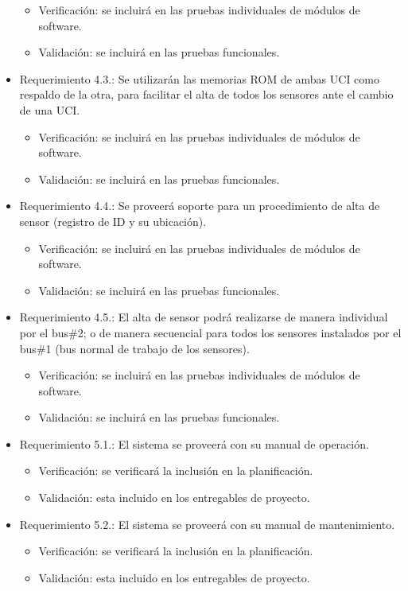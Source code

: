\documentclass[
11pt, %
codirector, %
]{charter}
\begin{document}
\begin{itemize}
\begin{itemize}
	\item Verificación: se incluirá en las pruebas individuales de módulos de software. 
	\item Validación: se incluirá en las pruebas funcionales. 
\end{itemize}
\item Requerimiento 4.3.: Se utilizarán las memorias ROM de ambas UCI como respaldo de la otra, para facilitar el alta de todos los sensores ante el cambio de una UCI. 
\begin{itemize}
	\item Verificación: se incluirá en las pruebas individuales de módulos de software. 
	\item Validación: se incluirá en las pruebas funcionales. 
\end{itemize}
\item Requerimiento 4.4.: Se proveerá soporte para un procedimiento de alta de sensor (registro de ID y su ubicación).  
\begin{itemize}
	\item Verificación: se incluirá en las pruebas individuales de módulos de software. 
	\item Validación: se incluirá en las pruebas funcionales. 
\end{itemize}
\item Requerimiento 4.5.: El alta de sensor podrá realizarse de manera individual por el bus\#2; o de manera secuencial para todos los sensores instalados por el bus\#1 (bus normal de trabajo de los sensores). 
\begin{itemize}
	\item Verificación: se incluirá en las pruebas individuales de módulos de software. 
	\item Validación: se incluirá en las pruebas funcionales. 
\end{itemize}
\item Requerimiento 5.1.: El sistema se proveerá con su manual de operación. 
\begin{itemize}
	\item Verificación: se verificará la inclusión en la planificación.
	\item Validación: esta incluido en los entregables de proyecto. 
\end{itemize}
\item Requerimiento 5.2.: El sistema se proveerá con su manual de mantenimiento. 
\begin{itemize}
	\item Verificación: se verificará la inclusión en la planificación.
	\item Validación: esta incluido en los entregables de proyecto. 
\end{itemize}


\end{itemize}
\end{document}

